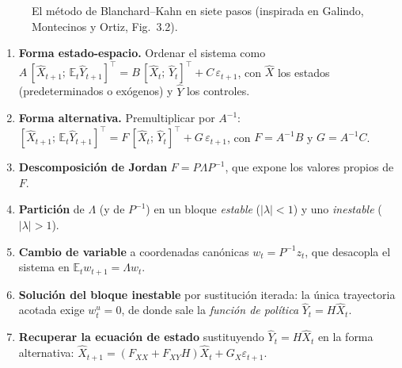 \documentclass[11pt,a4paper]{report}
\newcommand{\E}{\mathbb{E}}
\begin{document}
\begin{figure}[H]
\centering
{}
\caption{El método de Blanchard--Kahn en siete pasos (inspirada en Galindo,
Montecinos y Ortiz, Fig.~3.2).}
\label{fig:bk7}
\end{figure}

\begin{enumerate}[label=\textbf{Paso \arabic*.}, leftmargin=*, itemsep=2pt]
\item \textbf{Forma estado-espacio.} Ordenar el sistema como
  $A\,[\hat{X}_{t+1};\,\E_t\hat{Y}_{t+1}]^{\!\top}=B\,[\hat{X}_t;\,\hat{Y}_t]^{\!\top}
  +C\,\varepsilon_{t+1}$, con $\hat{X}$ los estados (predeterminados o exógenos) y
  $\hat{Y}$ los controles.
\item \textbf{Forma alternativa.} Premultiplicar por $A^{-1}$:
  $[\hat{X}_{t+1};\,\E_t\hat{Y}_{t+1}]^{\!\top}=F\,[\hat{X}_t;\,\hat{Y}_t]^{\!\top}
  +G\,\varepsilon_{t+1}$, con $F=A^{-1}B$ y $G=A^{-1}C$.
\item \textbf{Descomposición de Jordan} $F=P\Lambda P^{-1}$, que expone los valores
  propios de $F$.
\item \textbf{Partición} de $\Lambda$ (y de $P^{-1}$) en un bloque \emph{estable}
  ($|\lambda|<1$) y uno \emph{inestable} ($|\lambda|>1$).
\item \textbf{Cambio de variable} a coordenadas canónicas $w_t=P^{-1}z_t$, que
  desacopla el sistema en $\E_t w_{t+1}=\Lambda w_t$.
\item \textbf{Solución del bloque inestable} por sustitución iterada: la única
  trayectoria acotada exige $w^u_t=0$, de donde sale la \emph{función de política}
  $\hat{Y}_t=H\hat{X}_t$.
\item \textbf{Recuperar la ecuación de estado} sustituyendo $\hat{Y}_t=H\hat{X}_t$ en
  la forma alternativa: $\hat{X}_{t+1}=(F_{XX}+F_{XY}H)\hat{X}_t+G_X\varepsilon_{t+1}$.
\end{enumerate}
\end{document}
